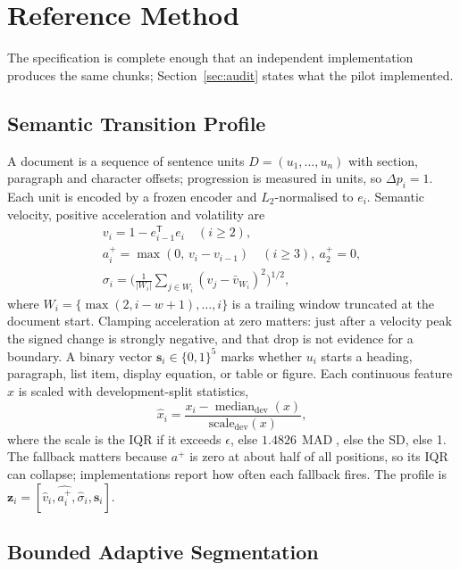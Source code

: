 \documentclass[conference,a4paper]{IEEEtran}
\DeclareMathOperator{\median}{median}
\DeclareMathOperator{\MAD}{MAD}
\begin{document}
\section{Reference Method}
\label{sec:method}

The specification is complete enough that an independent implementation produces the same chunks; Section~\ref{sec:audit} states what the pilot implemented.

\subsection{Semantic Transition Profile}

A document is a sequence of sentence units $D=(u_1,\ldots,u_n)$ with section, paragraph and character offsets; progression is measured in units, so $\Delta p_i=1$. Each unit is encoded by a frozen encoder and $L_2$-normalised to $e_i$. Semantic velocity, positive acceleration and volatility are
\begin{gather}
v_i = 1 - e_{i-1}^{\mathsf T}e_i \quad (i\ge 2), \label{eq:velocity}\\
a_i^+ = \max(0,\, v_i - v_{i-1}) \quad (i\ge 3),\ a_2^+=0, \label{eq:acceleration}\\
\sigma_i = \Big(\tfrac{1}{|W_i|}\textstyle\sum_{j\in W_i}(v_j-\bar v_{W_i})^2\Big)^{1/2}, \label{eq:volatility}
\end{gather}
where $W_i=\{\max(2,i-w+1),\ldots,i\}$ is a trailing window truncated at the document start. Clamping acceleration at zero matters: just after a velocity peak the signed change is strongly negative, and that drop is not evidence for a boundary. A binary vector $\mathbf{s}_i\in\{0,1\}^5$ marks whether $u_i$ starts a heading, paragraph, list item, display equation, or table or figure. Each continuous feature $x$ is scaled with development-split statistics,
\begin{equation}
\hat x_i = \frac{x_i-\median_{\mathrm{dev}}(x)}{\mathrm{scale}_{\mathrm{dev}}(x)},
\label{eq:normalise}
\end{equation}
where the scale is the IQR if it exceeds $\epsilon$, else $1.4826\,\MAD$, else the SD, else 1. The fallback matters because $a^+$ is zero at about half of all positions, so its IQR can collapse; implementations report how often each fallback fires. The profile is $\mathbf{z}_i=[\hat v_i,\widehat{a^+_i},\hat\sigma_i,\mathbf{s}_i]$.

\subsection{Bounded Adaptive Segmentation}
\end{document}
